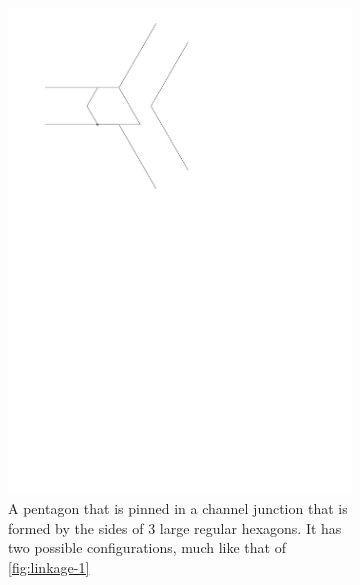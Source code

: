 \begin{figure}[h]
\begin{center}
  ~ %
  \begin{subfigure}[b]{0.49\textwidth}
	  \includegraphics[width=\textwidth]{graphics/switchTerminalFinalized2.pdf}
	  \caption{A pentagon that is pinned in a channel junction that is formed by the sides of 3 
large regular hexagons. It has two possible configurations, much like that of \ref{fig:linkage-1}}
	  \label{fig:linkage-2-1}
  \end{subfigure}
  \begin{subfigure}[b]{0.49\textwidth}

\end{subfigure}
\end{center}
\end{figure}
